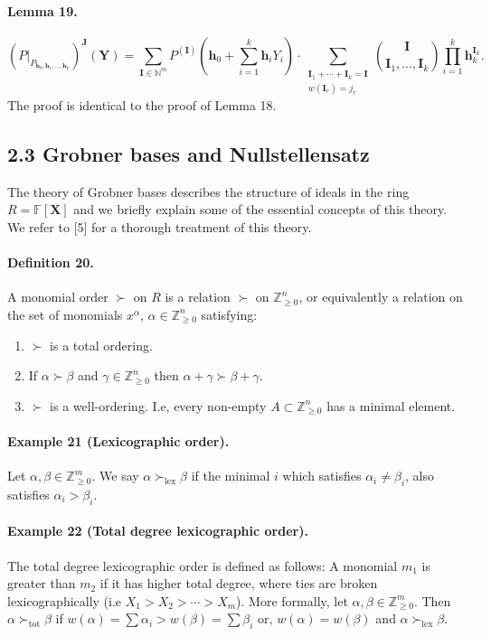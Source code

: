 \documentclass[10pt,a4paper]{article}
\begin{document}
\paragraph{Lemma 19.}
\[(P|_{P_{\boldsymbol h_0,\boldsymbol h_1,\ldots,\boldsymbol h_k}})^{\boldsymbol J}(\boldsymbol Y)=\sum_{\boldsymbol I\in\mathbb N^m}P^{(\boldsymbol I)}\left(\boldsymbol h_0+\sum_{i=1}^k\boldsymbol h_iY_i\right)\cdot\sum_{\substack{\boldsymbol I_1+\cdots+\boldsymbol I_k=\boldsymbol I\\w(\boldsymbol I_r)=j_r}}\binom{\boldsymbol I}{\boldsymbol I_1,\ldots,\boldsymbol I_k}\prod_{i=1}^k\boldsymbol h_k^{\boldsymbol I_k}.\]
The proof is identical to the proof of Lemma 18.
\subsection*{2.3 Grobner bases and Nullstellensatz}
The theory of Grobner bases describes the structure of ideals in the ring $R=\mathbb F[\boldsymbol X]$ and we briefly explain some of the essential concepts of this theory. We refer to [5] for a thorough treatment of this theory.
\paragraph{Definition 20.} A monomial order $\succ$ on $R$ is a relation $\succ$ on $\mathbb Z_{\geq0}^n$, or equivalently a relation on the set of monomials $x^\alpha$, $\alpha\in\mathbb Z_{\geq0}^n$ satisfying:
\begin{enumerate}
\item $\succ$ is a total ordering.
\item If $\alpha\succ\beta$ and $\gamma\in\mathbb Z_{\geq0}^n$ then $\alpha+\gamma\succ\beta+\gamma$.
\item $\succ$ is a well-ordering. I.e, every non-empty $A\subset\mathbb Z_{\geq0}^n$ has a minimal element.
\end{enumerate}
\paragraph{Example 21 (Lexicographic order).} Let $\alpha,\beta\in\mathbb Z_{\geq0}^m$. We say $\alpha\succ_{\mathrm{lex}}\beta$ if the minimal $i$ which satisfies $\alpha_i\neq\beta_i$, also satisfies $\alpha_i>\beta_i$.
\paragraph{Example 22 (Total degree lexicographic order).} The total degree lexicographic order is defined as follows: A monomial $m_1$ is greater than $m_2$ if it has higher total degree, where ties are broken lexicographically (i.e $X_1>X_2>\cdots>X_m$). More formally, let $\alpha,\beta\in\mathbb Z_{\geq0}^m$. Then $\alpha\succ_{\mathrm{tot}}\beta$ if $w(\alpha)=\sum\alpha_i>w(\beta)=\sum\beta_i$ or, $w(\alpha)=w(\beta)$ and $\alpha\succ_{\mathrm{lex}}\beta$.
\end{document}
